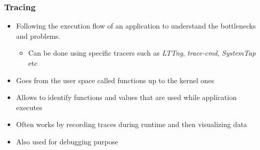 \begin{frame}
  \frametitle{Tracing}
  \begin{itemize}
    \item Following the execution flow of an application to understand the
          bottlenecks and problems.
    \begin{itemize}
      \item Can be done using specific tracers such as {\em LTTng},
            {\em trace-cmd}, {\em SystemTap} etc
    \end{itemize}
    \item Goes from the user space called functions up to the kernel ones
    \item Allows to identify functions and values that are used while
          application executes
    \item Often works by recording traces during runtime and then visualizing
          data
    \item Also used for debugging purpose
  \end{itemize}
\end{frame}
